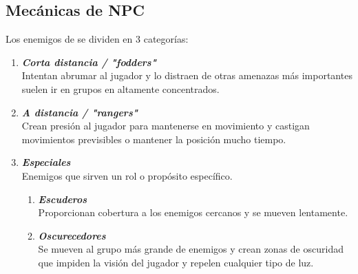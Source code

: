     \subsection{Mecánicas de NPC}
        Los enemigos de \TWD se dividen en 3 categorías:
            \begin{enumerate}
                \item \textbf{\textit{Corta distancia / "fodders"}} \\
                    Intentan abrumar al jugador y lo distraen de otras amenazas más importantes suelen ir en grupos en altamente concentrados.
                \item  \textbf{\textit{A distancia / "rangers"}} \\
                    Crean presión al jugador para mantenerse en movimiento y castigan movimientos previsibles o mantener la posición mucho tiempo.
                \item  \textbf{\textit{Especiales}} \\
                    Enemigos que sirven un rol o propósito específico.
                    \begin{enumerate}
                        \item \textbf{\textit{Escuderos}}\\
                            Proporcionan cobertura a los enemigos cercanos y se mueven lentamente.
                        \item \textbf{\textit{Oscurecedores}}\\
                            Se mueven al grupo más grande de enemigos y crean zonas de oscuridad que impiden la visión del jugador y repelen cualquier tipo de luz.
                    \end{enumerate}
            \end{enumerate}

